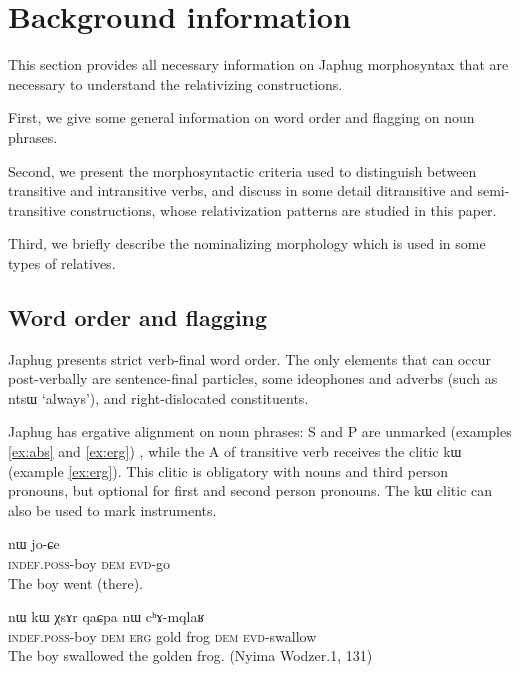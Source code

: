 \documentclass[oldfontcommands,oneside,a4paper,11pt]{article}
\newcommand{\ipa}[1]{{\phon #1}} %
\begin{document}
  


\section{Background information}
This section provides all necessary information on Japhug morphosyntax that are necessary to understand the relativizing constructions. 

First, we give some general information on word order and flagging on noun phrases.

Second, we present the morphosyntactic criteria used to distinguish between transitive and intransitive verbs, and discuss in some detail ditransitive and semi-transitive constructions, whose relativization patterns are studied in this paper.

Third, we briefly describe the nominalizing morphology which is used in some types of relatives.

\subsection{Word order and flagging}

Japhug presents strict verb-final word order. The only elements that can occur post-verbally are sentence-final particles, some ideophones and adverbs (such as \ipa{ntsɯ} `always'), and right-dislocated constituents.

Japhug has ergative alignment on noun phrases:  S and P are unmarked (examples \ref{ex:abs} and \ref{ex:erg}) , while the A of transitive verb receives the clitic \ipa{kɯ} (example \ref{ex:erg}). This clitic is obligatory with nouns and third person pronouns, but optional for first and second person pronouns. The \ipa{kɯ} clitic can also be used to mark instruments.

\begin{exe}
\ex \label{ex:abs}
\gll \ipa{tɤ-tɕɯ}  	\ipa{nɯ}  	 	\ipa{jo-ɕe}   \\
\textsc{indef.poss}-boy \textsc{dem}   \textsc{evd}-go \\
\glt The boy went (there).
\end{exe}

\begin{exe}
\ex \label{ex:erg}
\gll \ipa{tɤ-tɕɯ}  	\ipa{nɯ}  	\ipa{kɯ}  	\ipa{χsɤr}  	\ipa{qaɕpa}  	\ipa{nɯ}  	\ipa{cʰɤ-mqlaʁ}   \\
\textsc{indef.poss}-boy \textsc{dem} \textsc{erg} gold frog \textsc{dem} \textsc{evd}-swallow \\
\glt The boy swallowed the golden frog. (Nyima Wodzer.1, 131)
\end{exe}
\end{document}

